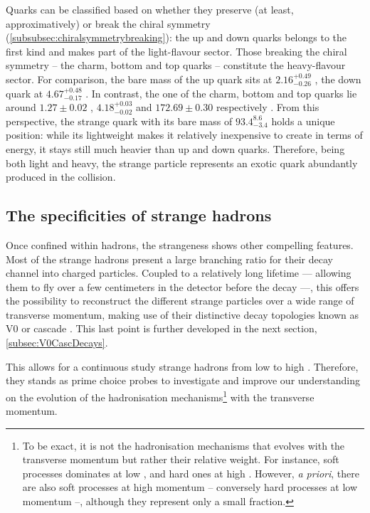 Quarks can be classified based on whether they preserve (at least, approximatively) or break the chiral symmetry (\Sec\ref{subsubsec:chiralsymmetrybreaking}): the up and down quarks belongs to the first kind and makes part of the light-flavour sector. Those breaking the chiral symmetry -- the charm, bottom and top quarks -- constitute the heavy-flavour sector. For comparison, the bare mass of the up quark sits at $2.16_{-0.26}^{+0.49}$ \mmass, the down quark at $4.67_{-0.17}^{+0.48}$ \mmass. In contrast, the one of the charm, bottom and top quarks lie around $1.27 \pm 0.02$ \gmass, $4.18_{-0.02}^{+0.03}$ \gmass and $172.69 \pm 0.30$ \gmass respectively \cite{particledatagroupReviewParticlePhysics2022}. From this perspective, the strange quark with its bare mass of $93.4_{-3.4}^{8.6}$ \mev holds a unique position: while its lightweight makes it relatively inexpensive to create in terms of energy, it stays still much heavier than up and down quarks. Therefore, being both light and heavy, the strange particle represents an exotic quark abundantly produced in the collision.

\subsection{The specificities of strange hadrons}
\label{subsec:SpecStrangeHadrons}

Once confined within hadrons, the strangeness shows other compelling features. Most of the strange hadrons present a large branching ratio for their decay channel into charged particles. Coupled to a relatively long lifetime --- allowing them to fly over a few centimeters in the detector before the decay ---, this offers the possibility to reconstruct the different strange particles over a wide range of transverse momentum, making use of their distinctive decay topologies known as V0 or cascade \cite{speltzCaracterisationEtatDense2006}. This last point is further developed in the next section, \Sec\ref{subsec:V0CascDecays}.

This allows for a continuous study strange hadrons from low to high \pT. Therefore, they stands as prime choice probes to investigate and improve our understanding on the evolution of the hadronisation mechanisms\footnote{To be exact, it is not the hadronisation mechanisms that evolves with the transverse momentum but rather their relative weight. For instance, soft processes dominates at low \pT, and hard ones at high \pT. However, \textit{a priori}, there are also soft processes at high momentum -- conversely hard processes at low momentum --, although they represent only a small fraction.} with the transverse momentum.

